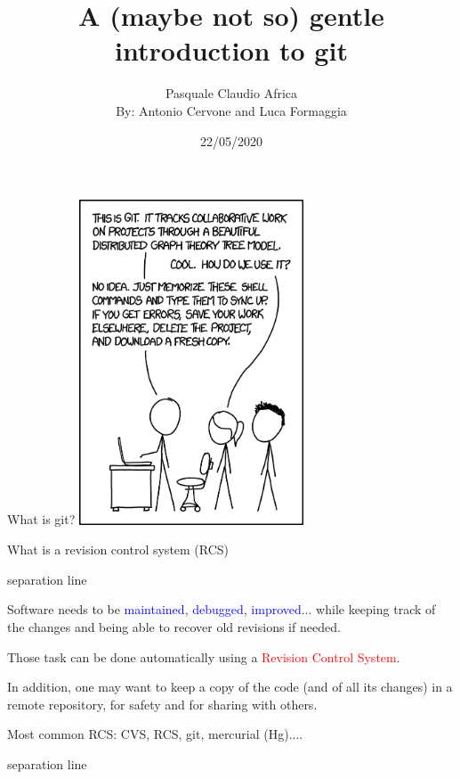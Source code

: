 \documentclass[hyperref={colorlinks}]{beamer}
\author{Pasquale Claudio Africa\protect\\{\small By: Antonio Cervone and Luca Formaggia}}
\title{A (maybe not so) gentle introduction to git}
\date{22/05/2020}
\newcommand{\titleline}[1][0.025cm]{%
\begin{beamercolorbox}[wd=\paperwidth,ht=#1,center]{separation line}%
\end{beamercolorbox}%
}
\begin{document}
\begin{frame}
\titlepage
\end{frame}
\begin{frame}{What is git?}
  \centering
  \includegraphics[width=0.5\textwidth]{figures/git_2x.png}
\end{frame}

\begin{frame}{What is a revision control system (RCS)}
\titleline
{\small
  Software needs to be \textcolor{blue}{maintained},
 \textcolor{blue}{debugged}, \textcolor{blue}{improved}...
while keeping track of the changes and being able to recover old revisions if needed.
\medskip

Those task can be done automatically using a \textcolor{red}{Revision Control System}.
\medskip

In addition, one may want to keep a copy of the code (and of all its changes) in a remote repository, for safety and for sharing with others.

\smallskip

Most common RCS: CVS, RCS, git, mercurial (Hg)....
}
\titleline
\end{frame}
\end{document}
